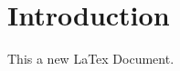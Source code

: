 \documentclass[12pt, a4paper, twoside]{report}
\author{John Smith}
\begin{document}


%
%

\chapter{Introduction}

This a new LaTex Document.

%
%


\end{document}
